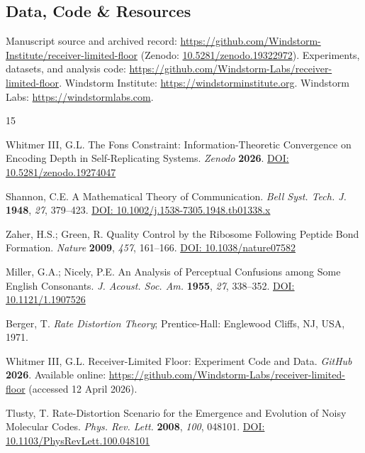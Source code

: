\documentclass[11pt]{article}
\begin{document}
\subsection*{Data, Code \& Resources}
\noindent Manuscript source and archived record: \url{https://github.com/Windstorm-Institute/receiver-limited-floor} (Zenodo: \href{https://doi.org/10.5281/zenodo.19322972}{10.5281/zenodo.19322972}). Experiments, datasets, and analysis code: \url{https://github.com/Windstorm-Labs/receiver-limited-floor}. Windstorm Institute: \url{https://windstorminstitute.org}. Windstorm Labs: \url{https://windstormlabs.com}.

\begin{thebibliography}{15}

Whitmer III, G.L.
The Fons Constraint: Information-Theoretic Convergence on Encoding Depth in Self-Replicating Systems.
\textit{Zenodo} \textbf{2026}.
\href{https://doi.org/10.5281/zenodo.19274047}{DOI: 10.5281/zenodo.19274047}

Shannon, C.E.
A Mathematical Theory of Communication.
\textit{Bell Syst. Tech. J.} \textbf{1948}, \textit{27}, 379--423.
\href{https://doi.org/10.1002/j.1538-7305.1948.tb01338.x}{DOI: 10.1002/j.1538-7305.1948.tb01338.x}

Zaher, H.S.; Green, R.
Quality Control by the Ribosome Following Peptide Bond Formation.
\textit{Nature} \textbf{2009}, \textit{457}, 161--166.
\href{https://doi.org/10.1038/nature07582}{DOI: 10.1038/nature07582}

Miller, G.A.; Nicely, P.E.
An Analysis of Perceptual Confusions among Some English Consonants.
\textit{J. Acoust. Soc. Am.} \textbf{1955}, \textit{27}, 338--352.
\href{https://doi.org/10.1121/1.1907526}{DOI: 10.1121/1.1907526}

Berger, T.
\textit{Rate Distortion Theory};
Prentice-Hall: Englewood Cliffs, NJ, USA, 1971.

Whitmer III, G.L.
Receiver-Limited Floor: Experiment Code and Data.
\textit{GitHub} \textbf{2026}.
Available online: \url{https://github.com/Windstorm-Labs/receiver-limited-floor} (accessed 12 April 2026).

Tlusty, T.
Rate-Distortion Scenario for the Emergence and Evolution of Noisy Molecular Codes.
\textit{Phys. Rev. Lett.} \textbf{2008}, \textit{100}, 048101.
\href{https://doi.org/10.1103/PhysRevLett.100.048101}{DOI: 10.1103/PhysRevLett.100.048101}


\end{thebibliography}
\end{document}
